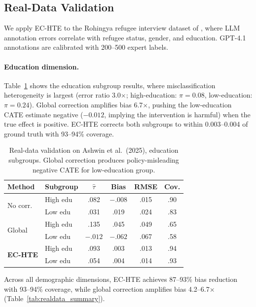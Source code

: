 \documentclass[11pt,a4paper]{article}
\begin{document}
\subsection{Real-Data Validation}
\label{sec:realdata}

We apply EC-HTE to the Rohingya refugee interview dataset of \citet{ashwin2025refugee}, where LLM annotation errors correlate with refugee status, gender, and education. GPT-4.1 annotations are calibrated with 200--500 expert labels.

\paragraph{Education dimension.} Table~\ref{tab:realdata} shows the education subgroup results, where misclassification heterogeneity is largest (error ratio 3.0$\times$; high-education: $\pi = 0.08$, low-education: $\pi = 0.24$). Global correction amplifies bias 6.7$\times$, pushing the low-education CATE estimate negative ($-0.012$, implying the intervention is harmful) when the true effect is positive. EC-HTE corrects both subgroups to within 0.003--0.004 of ground truth with 93--94\% coverage.

\begin{table}[t]
\centering
\small
\setlength{\tabcolsep}{3pt}
\begin{tabular}{llcccc}
\toprule
Method & Subgroup & $\hat{\tau}$ & Bias & RMSE & Cov. \\
\midrule
\multirow{2}{*}{No corr.}
 & High edu & .082 & $-.008$ & .015 & .90 \\
 & Low edu & .031 & .019 & .024 & .83 \\
\midrule
\multirow{2}{*}{Global}
 & High edu & .135 & .045 & .049 & .65 \\
 & Low edu & $-.012$ & $-.062$ & .067 & .58 \\
\midrule
\multirow{2}{*}{\textbf{EC-HTE}}
 & High edu & .093 & .003 & .013 & .94 \\
 & Low edu & .054 & .004 & .014 & .93 \\
\bottomrule
\end{tabular}
\caption{Real-data validation on Ashwin et al.\ (2025), education subgroups. Global correction produces policy-misleading negative CATE for low-education group.}
\label{tab:realdata}
\end{table}

Across all demographic dimensions, EC-HTE achieves 87--93\% bias reduction with 93--94\% coverage, while global correction amplifies bias 4.2--6.7$\times$ (Table~\ref{tab:realdata_summary}).
\end{document}
